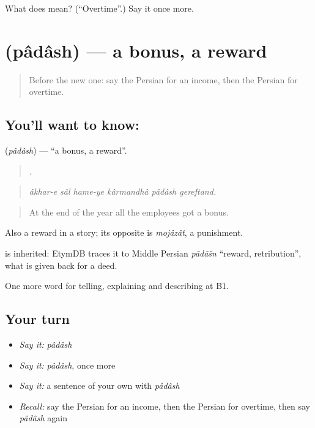 \begin{tcolorbox}[breakable,colback=teal!4,colframe=teal!35!black,title={Before you move on}]
What does   mean? (\textquotedblleft{}Overtime\textquotedblright{}.) Say it once more.
\end{tcolorbox}
\section[\texorpdfstring{\fa{پاداش} (pâdâsh)}{پاداش (pâdâsh)}]{ (pâdâsh) — a bonus, a reward}

\label{lesson:FA-C378-padash}



\begin{quote}
Before the new one: say the Persian for an income, then the Persian for overtime.
\end{quote}

\subsection*{You'll want to know: }
\textbf{} (\emph{pâdâsh}) — \textquotedblleft{}a bonus, a reward\textquotedblright{}.

\begin{quote}
     .
\end{quote}

\begin{quote}
\emph{âkhar-e sâl hame-ye kârmandhâ pâdâsh gereftand.}
\end{quote}

\begin{quote}
At the end of the year all the employees got a bonus.
\end{quote}

Also a reward in a story; its opposite is \emph{mojâzât}, a punishment.

\begin{cousinweb}
\textbf{} is inherited: EtymDB traces it to Middle Persian \emph{pādāšn} \textquotedblleft{}reward, retribution\textquotedblright{}, what is given back for a deed.
\end{cousinweb}

\begin{grammarlens}[title={What you've built}]
One more word for telling, explaining and describing at B1.
\end{grammarlens}

\subsection*{Your turn}
\begin{itemize}
\raggedright
  \item \emph{Say it:} \emph{pâdâsh}
  \item \emph{Say it:} \emph{pâdâsh}, once more
  \item \emph{Say it:} a sentence of your own with \emph{pâdâsh}
  \item \emph{Recall:} say the Persian for an income, then the Persian for overtime, then say \emph{pâdâsh} again
\end{itemize}


